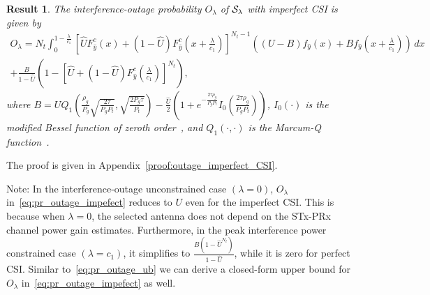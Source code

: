 \documentclass[12pt,draftcls,peerreview,onecolumn]{IEEEtran}
\newtheorem{result}{{\bf Result}}
\newcommand{\lam}{\lambda}
\newcommand{\Nt}{{N_t}}
\newcommand{\Nr}{{N_r}}
\newcommand{\Pt}{{P_t}}
\newcommand{\itau}{\tau}
\newcommand{\cone}{c_{1}}
\newcommand{\ctwo}{c_{2}}
\newcommand{\out}{O}
\newcommand{\lambym}{\frac{\lam}{\cone}}
\newcommand{\al}{\ctwo}
\newcommand{\snr}{\Omega}
\newcommand{\un}{U}
\newcommand{\callamrule}{{\cal S_{{\lam}}}}
\newcommand{\outlam}{\out_{\lam}}
\newcommand{\unhat}{\widehat{\un}}
\newcommand{\snrhat}{\widehat{\snr}}
\newcommand{\gpilotpower}{P_g}
\newcommand{\yhat}{\hat{y}}
\newcommand{\Probglt}{B}
\newcommand{\albysnrhat}[1][]{\frac{\al#1}{\snrhat}}
\newcommand{\rhog}{\rho_g}
\begin{document}
\begin{result}
\label{thm:outage_imperfect_CSI}
  The interference-outage probability $\outlam$ of $\callamrule$ with imperfect CSI is given by
\begin{multline}
\label{eq:pr_outage_impefect} 
\!\outlam \!=\! \Nt \!\int_{0}^{1-\lambym} 	
\!\left[ \unhat F_{\yhat}^{c}\left(x\right) + \left(1 -\unhat\right)F_{\yhat}^{c}\left(x+\lambym\right)\right]^{\Nt-1}\!\! \left(\! (\un - \Probglt) f_{\yhat}\left(x\right)  \!+\!  \Probglt f_{\yhat}\!\left(\! x+\lambym\right) \!\right)\, dx\\
+ \frac{ \Probglt}{1 - \unhat} \left( 1 - \left[\unhat + \left(1 -\unhat\right)F_{\yhat}^{c}\left(\lambym\right)  \right]^{\Nt}  \right),
\end{multline}
%
%
where  $\Probglt \!=\! \un  Q_1\!\left(\frac{\rhog}{ \gpilotpower} \sqrt{\frac{2\itau}{ \gpilotpower\Pt}},\sqrt{\frac{2 \gpilotpower\itau}{\Pt}}\right) \! - \frac{\unhat}{2} \left(\! 1 + e^{-\frac{2\itau\rhog}{ \gpilotpower\Pt}}I_{0}\!\left(\frac{2\itau\rhog}{ \gpilotpower\Pt} \right) \!\right)$, $I_{0}(\cdot)$ is the modified Bessel function of zeroth order~\cite[(8.406.3)]{gradshteyn00_book}, and  $Q_1(\cdot,\cdot)$ is the Marcum-Q function~\cite[(4.34)]{simon_alouini_book}.  %
\end{result}
%
\begin{IEEEproof}
	The proof is given in Appendix~\ref{proof:outage_imperfect_CSI}.
\end{IEEEproof}
%

Note: In the interference-outage unconstrained case $\left(\lam=0\right)$, $\outlam$ in~\eqref{eq:pr_outage_impefect} reduces to $\un$ even for the imperfect CSI. This is because when $\lam=0$, the selected  antenna does not depend on the  STx-PRx channel power gain estimates. Furthermore, in the peak interference power constrained case $\left(\lam=\cone\right)$, it simplifies to $\frac{ \Probglt \left( 1-\unhat^{\Nt}\right) }{1-\unhat}$, while it is zero for perfect CSI. Similar to~\eqref{eq:pr_outage_ub} we can derive a closed-form upper bound for $\outlam$ in~\eqref{eq:pr_outage_impefect} as well.
\end{document}
